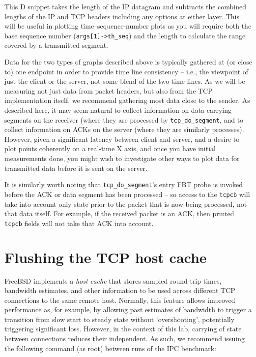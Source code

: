 \documentclass[a4paper,10pt]{article}
\begin{document}
This D snippet takes the length of the IP datagram and subtracts the combined
lengths of the IP and TCP headers including any options at either layer.
This will be useful in plotting time--sequence-number plots as you will
require both the base sequence number (\texttt{args[1]->th\_seq}) and the
length to calculate the range covered by a transmitted segment.

Data for the two types of graphs described above is typically gathered at (or
close to) one endpoint in order to provide time line consistency -- i.e., the
viewpoint of just the client or the server, not some blend of the two
time lines.
As we will be measuring not just data from packet headers, but also from the
TCP implementation itself, we recommend gathering most data close to the
sender.
As described here, it may seem natural to collect information on data-carrying
segments on the receiver (where they are processed by
\texttt{tcp\_do\_segment}, and to collect information on ACKs on the server
(where they are similarly processes).
However, given a significant latency between client and server, and a desire
to plot points coherently on a real-time X axis, and once you have initial
measurements done, you might wish to investigate other ways to plot data for
transmitted data before it is sent on the server.

It is similarly worth noting that \texttt{tcp\_do\_segment}'s entry FBT probe
is invoked before the ACK or data segment has been processed -- so access to
the \texttt{tcpcb} will take into account only state prior to the packet that
is now being processed, not that data itself.
For example, if the received packet is an ACK, then printed \texttt{tcpcb}
fields will not take that ACK into account.

\section*{Flushing the TCP host cache}

FreeBSD implements a \textit{host cache} that stores sampled round-trip times,
bandwidth estimates, and other information to be used across different TCP
connections to the same remote host.
Normally, this feature allows improved performance as, for example, by
allowing past estimates of bandwidth to trigger a transition from slow start
to steady state without `overshooting', potentially triggering significant
loss.
However, in the context of this lab, carrying of state between connections
reduces their independent.
As such, we recommend issuing the following command (as root) between runs of
the IPC benchmark:
\end{document}
